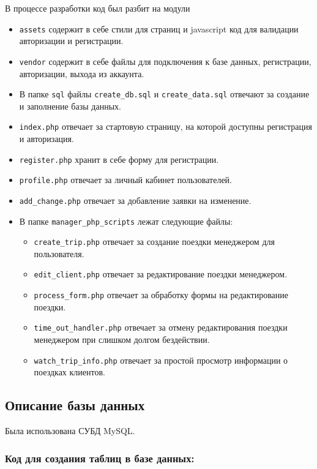 \documentclass[a4paper,12pt]{article}
\begin{document}
В процессе разработки код был разбит на модули

\begin{itemize}
    \item \texttt{assets} содержит в себе стили для страниц и javascript код для валидации авторизации и регистрации.
    \item \texttt{vendor} содержит в себе файлы для подключения к базе данных, регистрации, авторизации, выхода из аккаунта.
    \item В папке \texttt{sql} файлы \texttt{create\_db.sql} и \texttt{create\_data.sql} отвечают за создание и заполнение базы данных.
    \item \texttt{index.php} отвечает за стартовую страницу, на которой доступны регистрация и авторизация.
    \item \texttt{register.php} хранит в себе форму для регистрации.
    \item \texttt{profile.php} отвечает за личный кабинет пользователей.
    \item \texttt{add\_change.php} отвечает за добавление заявки на изменение.
    \item В папке \texttt{manager\_php\_scripts} лежат следующие файлы:
          \begin{itemize}
              \item \texttt{create\_trip.php} отвечает за создание поездки менеджером для пользователя.
              \item \texttt{edit\_client.php} отвечает за редактирование поездки менеджером.
              \item \texttt{process\_form.php} отвечает за обработку формы на редактирование поездки.
              \item \texttt{time\_out\_handler.php} отвечает за отмену редактирования поездки менеджером при слишком долгом бездействии.
              \item \texttt{watch\_trip\_info.php} отвечает за простой просмотр информации о поездках клиентов.
          \end{itemize}
\end{itemize}

\subsection{Описание базы данных}

Была использована СУБД MySQL.

\subsubsection{Код для создания таблиц в базе данных:}
\end{document}
